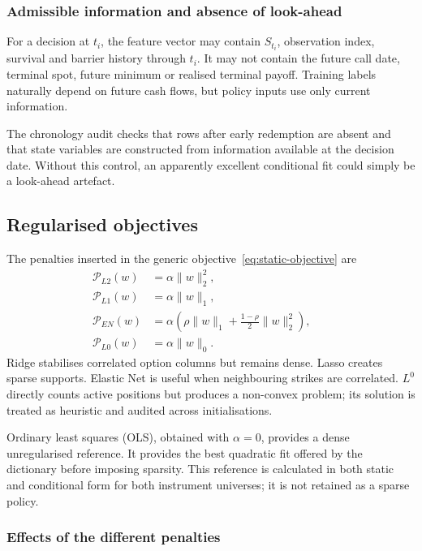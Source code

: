 \documentclass[12pt,a4paper]{article}
\newcommand{\1}{\mathbf{1}}
\begin{document}
\subsubsection*{Admissible information and absence of look-ahead}

For a decision at $t_i$, the feature vector may contain $S_{t_i}$, observation
index, survival and barrier history through $t_i$. It may not contain the
future call date, terminal spot, future minimum or realised terminal payoff.
Training labels naturally depend on future cash flows, but policy inputs use
only current information.

The chronology audit checks that rows after early redemption are absent and
that state variables are constructed from information available at the
decision date. Without this control, an apparently excellent conditional fit
could simply be a look-ahead artefact.

\subsection{Regularised objectives}

The penalties inserted in the generic objective~\eqref{eq:static-objective} are
\begin{align}
 \mathcal P_{L2}(w)&=\alpha\lVert w\rVert_2^2,
 &&\label{eq:ridge-penalty}\\
 \mathcal P_{L1}(w)&=\alpha\lVert w\rVert_1,
 &&\label{eq:lasso-penalty}\\
 \mathcal P_{EN}(w)&=\alpha\left(\rho\lVert w\rVert_1+\frac{1-\rho}{2}\lVert w\rVert_2^2\right),
 &&\label{eq:elastic-net-penalty}\\
 \mathcal P_{L0}(w)&=\alpha\lVert w\rVert_0.
 &&\label{eq:l0-penalty}
\end{align}
Ridge stabilises correlated option columns but remains dense. Lasso creates sparse supports. Elastic Net is useful when neighbouring strikes are correlated. $L^0$ directly counts active positions but produces a non-convex problem; its solution is treated as heuristic and audited across initialisations.

Ordinary least squares (OLS), obtained with $\alpha=0$, provides a dense
unregularised reference. It provides the best quadratic fit offered by the
dictionary before imposing sparsity. This reference is calculated in both static and
conditional form for both instrument universes; it is not retained as a sparse
policy.

\subsubsection*{Effects of the different penalties}
\end{document}
